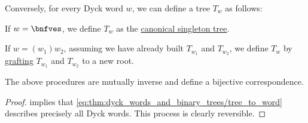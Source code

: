 \begin{corollary}
\begin{thmenum}
     Conversely, for every Dyck word \( w \), we can define a tree \( T_w \) as follows:
    \begin{thmenum}
       If \( w = \bnfves \), we define \( T_w \) as the \hyperref[def:canonical_singleton_tree]{canonical singleton tree}.

       If \( w = (w_1) w_2 \), assuming we have already built \( T_{w_1} \) and \( T_{w_2} \), we define \( T_w \) by \hyperref[def:ordered_tree_grafting_product]{grafting} \( T_{w_1} \) and \( T_{w_2} \) to a new root.
    \end{thmenum}

     The above procedures are mutually inverse and define a bijective correspondence.
  \end{thmenum}
\end{corollary}
\begin{proof}
   implies that \eqref{eq:thm:dyck_words_and_binary_trees/tree_to_word} describes precisely all Dyck words. This process is clearly reversible.
\end{proof}
